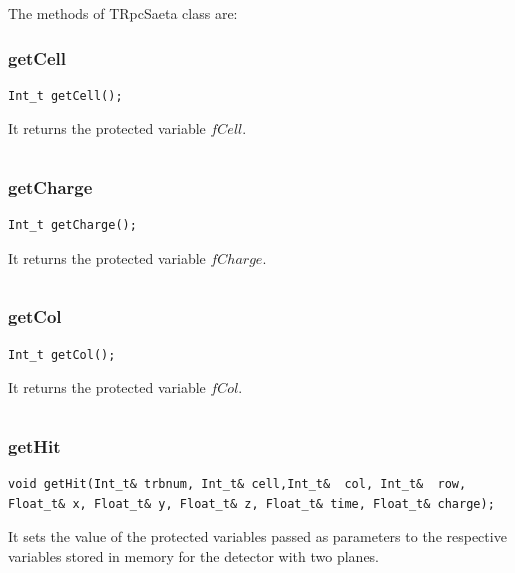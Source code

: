 \documentclass[a4paper]{book}
\begin{document}
The methods of TRpcSaeta class are:

\subsubsection{getCell}

\begin{lstlisting}[style=customc]
Int_t getCell();
\end{lstlisting}

It returns the protected variable $fCell$.

\[\]

\subsubsection{getCharge}

\begin{lstlisting}[style=customc]
Int_t getCharge();
\end{lstlisting}

It returns the protected variable $fCharge$.

\[\]

\subsubsection{getCol}

\begin{lstlisting}[style=customc]
Int_t getCol();
\end{lstlisting}

It returns the protected variable $fCol$.

\[\]

\subsubsection{getHit}

\begin{lstlisting}[style=customc]
void getHit(Int_t& trbnum, Int_t& cell,Int_t&  col, Int_t&  row, Float_t& x, Float_t& y, Float_t& z, Float_t& time, Float_t& charge);
\end{lstlisting}

It sets the value of the protected variables passed as parameters to the respective variables stored in memory for the detector with two planes.
\end{document}
